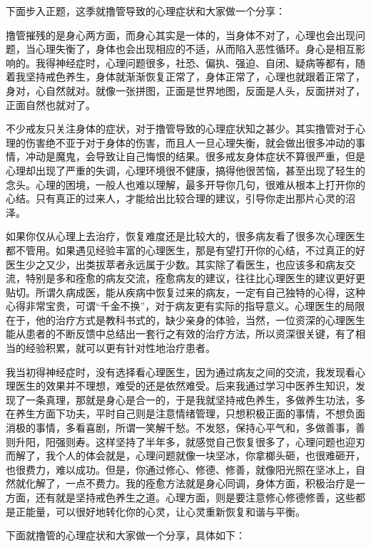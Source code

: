 下面步入正题，这季就撸管导致的心理症状和大家做一个分享：

撸管摧残的是身心两方面，而身心其实是一体的，当身体不对了，心理也会出现问题，当心理失衡了，身体也会出现相应的不适，从而陷入恶性循环。身心是相互影响的。我得神经症时，心理问题很多，社恐、偏执、强迫、自闭、疑病等都有，随着我坚持戒色养生，身体就渐渐恢复正常了，身体正常了，心理也就跟着正常了，身对，心自然就对。就像一张拼图，正面是世界地图，反面是人头，反面拼对了，正面自然也就对了。

不少戒友只关注身体的症状，对于撸管导致的心理症状知之甚少。其实撸管对于心理的伤害绝不亚于对于身体的伤害，而且人一旦心理失衡，就会做出很多冲动的事情，冲动是魔鬼，会导致让自己悔恨的结果。很多戒友身体症状不算很严重，但是心理却出现了严重的失调，心理环境很不健康，搞得他很苦恼，甚至出现了轻生的念头。心理的困境，一般人也难以理解，最多开导你几句，很难从根本上打开你的心结。只有真正的过来人，才能给出比较合理的建议，引导你走出那片心灵的沼泽。

如果你仅从心理上去治疗，恢复难度还是比较大的，很多病友看了很多次心理医生都不管用。如果遇见经验丰富的心理医生，那是有望打开你的心结，不过真正的好医生少之又少，出类拔萃者永远属于少数。其实除了看医生，也应该多和病友交流，特别是多和痊愈的病友交流，痊愈病友的建议，往往比心理医生的建议更好更贴切。所谓久病成医，能从疾病中恢复过来的病友，一定有自己独特的心得，这种心得非常宝贵，可谓“千金不换”，对于病友更有实际的指导意义。心理医生的局限在于，他的治疗方式是教科书式的，缺少亲身的体验，当然，一位资深的心理医生能从患者的不断反馈中总结出一套行之有效的治疗方法，所以资深很关键，有了相当的经验积累，就可以更有针对性地治疗患者。

我当初得神经症时，没有选择看心理医生，因为通过病友之间的交流，我发现看心理医生的效果并不理想，难受的还是依然难受。后来我通过学习中医养生知识，发现了一条真理，那就是身心是合一的，于是我就坚持戒色养生，多做养生功法，多在养生方面下功夫，平时自己则是注意情绪管理，只想积极正面的事情，不想负面消极的事情，多看喜剧，所谓一笑解千愁。不发怒，保持心平气和，多做善事，善则升阳，阳强则寿。这样坚持了半年多，就感觉自己恢复很多了，心理问题也迎刃而解了，我个人的体会就是，心理问题就像一块坚冰，你拿榔头砸，也很难砸开，也很费力，难以成功。但是，你通过修心、修德、修善，就像阳光照在坚冰上，自然就化解了，一点不费力。我的痊愈方法就是身心同调，身体方面，积极治疗是一方面，还有就是坚持戒色养生之道。心理方面，则是要注意修心修德修善，这些都是正能量，可以很好地转化你的心灵，让心灵重新恢复和谐与平衡。

下面就撸管的心理症状和大家做一个分享，具体如下：

